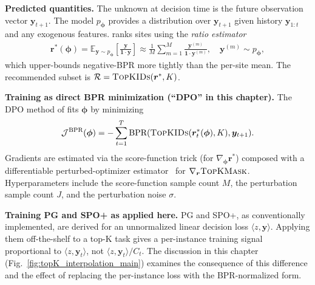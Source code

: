 \textbf{Predicted quantities.} The unknown at decision time is the future observation vector $\bm{y}_{t+1}$. The model $p_{\bm{\phi}}$ provides a distribution over $\bm{y}_{t+1}$ given history $\bm{y}_{1:t}$ and any exogenous features. \citet{heuton2025decisionaware} ranks sites using the \emph{ratio estimator}
\begin{align}
\bm{r}^*(\bm{\phi}) = \mathbb{E}_{\bm{y} \sim p_{\bm{\phi}}}\!\left[\frac{\bm{y}}{\bm{1} \cdot \bm{y}}\right] \approx \frac{1}{M} \sum_{m=1}^M \frac{\bm{y}^{(m)}}{\bm{1} \cdot \bm{y}^{(m)}}, \quad \bm{y}^{(m)} \sim p_{\bm{\phi}},
\end{align}
which upper-bounds negative-BPR more tightly than the per-site mean. The recommended subset is $\mathcal{R} = \textsc{TopKIDs}(\bm{r}^*, K)$.

\textbf{Training as direct BPR minimization (``DPO'' in this chapter).} The DPO method of \citet{heuton2025decisionaware} fits $\bm{\phi}$ by minimizing
\begin{align}
\mathcal{J}^{\text{BPR}}(\bm{\phi}) = -\sum_{t=1}^T \text{BPR}(\textsc{TopKIDs}(\bm{r}^*_t(\bm{\phi}), K), \bm{y}_{t+1}).
\end{align}
Gradients are estimated via the score-function trick (for $\nabla_{\bm{\phi}} \bm{r}^*$) composed with a differentiable perturbed-optimizer estimator~\citep{berthetLearningDifferentiablePerturbed2020} for $\nabla_{\bm{r}} \textsc{TopKMask}$. Hyperparameters include the score-function sample count $M$, the perturbation sample count $J$, and the perturbation noise $\sigma$.

\textbf{Training PG and SPO+ as applied here.} PG and SPO+, as conventionally implemented, are derived for an unnormalized linear decision loss $\langle z, \bm{y}\rangle$. Applying them off-the-shelf to a top-K task gives a per-instance training signal proportional to $\langle z, \bm{y}_t\rangle$, not $\langle z, \bm{y}_t\rangle/C_t$. The discussion in this chapter (Fig.~\ref{fig:topK_interpolation_main}) examines the consequence of this difference and the effect of replacing the per-instance loss with the BPR-normalized form.
